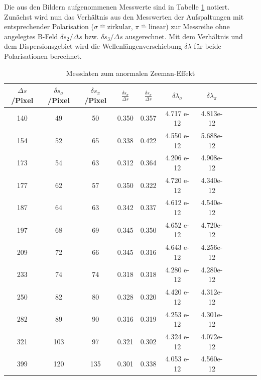 Die aus den Bildern aufgenommenen Messwerte sind in Tabelle \ref{tab:blau} notiert.
Zunächst wird nun das Verhältnis aus den Messwerten der Aufspaltungen mit entsprechender Polarisation ($\sigma \widehat{=} \text{zirkular}$, $\pi \widehat{=} \text{linear}$) zur Messreihe ohne angelegtes B-Feld $\delta s_{2}/\Delta s$ bzw. $\delta s_{3}/ \Delta s$ ausgerechnet.
Mit dem Verhältnis und dem Dispersionsgebiet wird die Wellenlängenverschiebung $\delta \lambda$ für beide Polarisationen berechnet.
%
%
\begin{table}[h!]
  \centering
  \caption{Messdaten zum anormalen Zeeman-Effekt}
  \label{tab:blau}
  \begin{tabular}{c c c c c c c c c c c}
    \toprule

      $\Delta s$/Pixel & $\delta s_{\sigma}$/Pixel & $\delta s_{\pi}$/Pixel & $\frac{\delta s_{\sigma}}{\Delta s}$ & $\frac{\delta s_{\pi}}{\Delta s}$  & $ \delta \lambda_{\sigma} $ &  $\delta \lambda_{\pi}$    \\
      \midrule
      140   &   49    &   50    &   0.350   &     0.357     &   4.717 e-12   & 4.813e-12  \\
      154   &   52    &   65    &   0.338   &     0.422     &   4.550 e-12   & 5.688e-12  \\
      173   &   54    &   63    &   0.312   &     0.364     &   4.206 e-12   & 4.908e-12  \\
      177   &   62    &   57    &   0.350   &     0.322     &   4.720 e-12   & 4.340e-12  \\
      187   &   64    &   63    &   0.342   &     0.337     &   4.612 e-12   & 4.540e-12  \\
      197   &   68    &   69    &   0.345   &     0.350     &   4.652 e-12   & 4.720e-12  \\
      209   &   72    &   66    &   0.345   &     0.316     &   4.643 e-12   & 4.256e-12  \\
      233   &   74    &   74    &   0.318   &     0.318     &   4.280 e-12   & 4.280e-12  \\
      250   &   82    &   80    &   0.328   &     0.320     &   4.420 e-12   & 4.312e-12  \\
      282   &   89    &   90    &   0.316   &     0.319     &   4.253 e-12   & 4.301e-12  \\
      321   &   103   &   97    &   0.321   &     0.302     &   4.324 e-12   & 4.072e-12  \\
      399   &   120   &   135   &   0.301   &     0.338     &   4.053 e-12   & 4.560e-12  \\
    \bottomrule
  \end{tabular}
\end{table}
